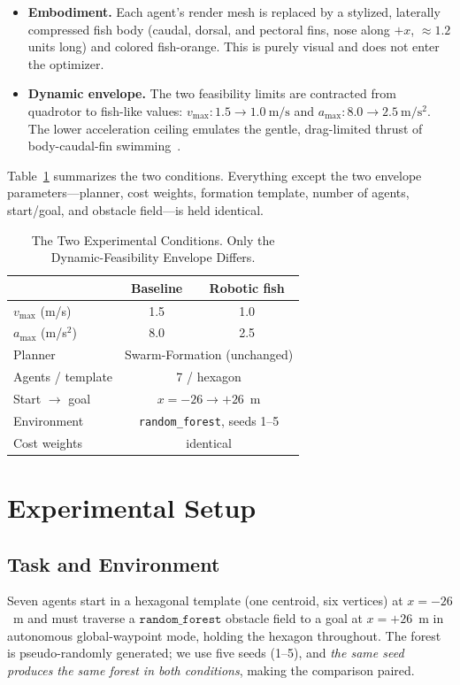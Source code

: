 \documentclass[journal]{IEEEtran}
\begin{document}
\begin{itemize}
  \item \textbf{Embodiment.} Each agent's render mesh is replaced by a
  stylized, laterally compressed fish body (caudal, dorsal, and pectoral
  fins, nose along $+x$, $\approx\!1.2$ units long) and colored fish-orange.
  This is purely visual and does not enter the optimizer.
  \item \textbf{Dynamic envelope.} The two feasibility limits are contracted
  from quadrotor to fish-like values:
  $v_{\max}:1.5\!\rightarrow\!1.0~\mathrm{m/s}$ and
  $a_{\max}:8.0\!\rightarrow\!2.5~\mathrm{m/s^2}$. The lower acceleration
  ceiling emulates the gentle, drag-limited thrust of body-caudal-fin
  swimming~\cite{lighthill1971large}.
\end{itemize}

Table~\ref{tab:conditions} summarizes the two conditions. Everything except
the two envelope parameters---planner, cost weights, formation template,
number of agents, start/goal, and obstacle field---is held identical.

\begin{table}[t]
\caption{The Two Experimental Conditions. Only the Dynamic-Feasibility
Envelope Differs.}
\label{tab:conditions}
\centering
\begin{tabular}{lcc}
\toprule
& \textbf{Baseline} & \textbf{Robotic fish}\\
\midrule
$v_{\max}$ (m/s)      & 1.5 & 1.0\\
$a_{\max}$ (m/s$^2$)  & 8.0 & 2.5\\
\midrule
Planner               & \multicolumn{2}{c}{Swarm-Formation (unchanged)}\\
Agents / template     & \multicolumn{2}{c}{7 / hexagon}\\
Start $\rightarrow$ goal & \multicolumn{2}{c}{$x=-26\rightarrow +26$~m}\\
Environment           & \multicolumn{2}{c}{\texttt{random\_forest}, seeds 1--5}\\
Cost weights          & \multicolumn{2}{c}{identical}\\
\bottomrule
\end{tabular}
\end{table}

\section{Experimental Setup}
\label{sec:exp}

\subsection{Task and Environment}
Seven agents start in a hexagonal template (one centroid, six vertices) at
$x=-26$~m and must traverse a $\texttt{random\_forest}$ obstacle field to a
goal at $x=+26$~m in autonomous global-waypoint mode, holding the hexagon
throughout. The forest is pseudo-randomly generated; we use five seeds
(1--5), and \emph{the same seed produces the same forest in both
conditions}, making the comparison paired.
\end{document}
